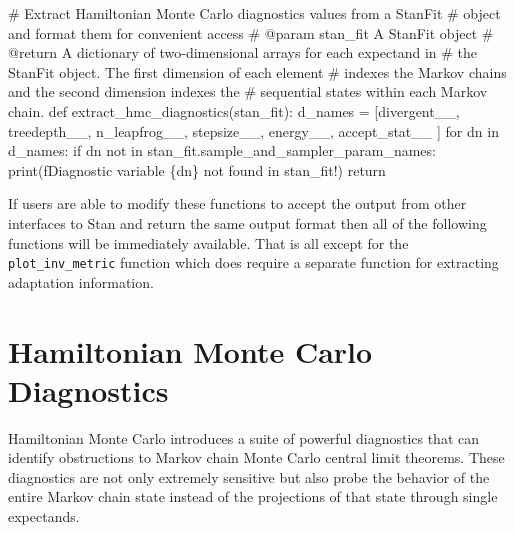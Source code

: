 \documentclass[
  letterpaper,
  DIV=11,
  numbers=noendperiod]{scrartcl}
\newenvironment{Shaded}{\begin{snugshade}}{\end{snugshade}}
\newcommand{\BuiltInTok}[1]{\textcolor[rgb]{0.00,0.23,0.31}{#1}}
\newcommand{\CommentTok}[1]{\textcolor[rgb]{0.37,0.37,0.37}{#1}}
\newcommand{\ControlFlowTok}[1]{\textcolor[rgb]{0.00,0.23,0.31}{#1}}
\newcommand{\KeywordTok}[1]{\textcolor[rgb]{0.00,0.23,0.31}{#1}}
\newcommand{\NormalTok}[1]{\textcolor[rgb]{0.00,0.23,0.31}{#1}}
\newcommand{\OperatorTok}[1]{\textcolor[rgb]{0.37,0.37,0.37}{#1}}
\newcommand{\SpecialCharTok}[1]{\textcolor[rgb]{0.37,0.37,0.37}{#1}}
\newcommand{\SpecialStringTok}[1]{\textcolor[rgb]{0.13,0.47,0.30}{#1}}
\newcommand{\StringTok}[1]{\textcolor[rgb]{0.13,0.47,0.30}{#1}}
\begin{document}
\begin{Shaded}
\begin{Highlighting}[]
\CommentTok{\# Extract Hamiltonian Monte Carlo diagnostics values from a StanFit}
\CommentTok{\# object and format them for convenient access}
\CommentTok{\# @param stan\_fit A StanFit object}
\CommentTok{\# @return A dictionary of two{-}dimensional arrays for each expectand in }
\CommentTok{\#         the StanFit object.  The first dimension of each element }
\CommentTok{\#         indexes the Markov chains and the second dimension indexes the }
\CommentTok{\#         sequential states within each Markov chain. }
\KeywordTok{def}\NormalTok{ extract\_hmc\_diagnostics(stan\_fit):}
\NormalTok{  d\_names }\OperatorTok{=}\NormalTok{ [}\StringTok{\textquotesingle{}divergent\_\_\textquotesingle{}}\NormalTok{, }\StringTok{\textquotesingle{}treedepth\_\_\textquotesingle{}}\NormalTok{, }\StringTok{\textquotesingle{}n\_leapfrog\_\_\textquotesingle{}}\NormalTok{,}
             \StringTok{\textquotesingle{}stepsize\_\_\textquotesingle{}}\NormalTok{, }\StringTok{\textquotesingle{}energy\_\_\textquotesingle{}}\NormalTok{, }\StringTok{\textquotesingle{}accept\_stat\_\_\textquotesingle{}}\NormalTok{ ]}
  \ControlFlowTok{for}\NormalTok{ dn }\KeywordTok{in}\NormalTok{ d\_names:}
    \ControlFlowTok{if}\NormalTok{ dn }\KeywordTok{not} \KeywordTok{in}\NormalTok{ stan\_fit.sample\_and\_sampler\_param\_names:}
      \BuiltInTok{print}\NormalTok{(}\SpecialStringTok{f\textquotesingle{}Diagnostic variable }\SpecialCharTok{\{}\NormalTok{dn}\SpecialCharTok{\}}\SpecialStringTok{ not found in stan\_fit!\textquotesingle{}}\NormalTok{)}
      \ControlFlowTok{return}
\end{Highlighting}
\end{Shaded}

If users are able to modify these functions to accept the output from
other interfaces to Stan and return the same output format then all of
the following functions will be immediately available. That is all
except for the \texttt{plot\_inv\_metric} function which does require a
separate function for extracting adaptation information.

\hypertarget{hamiltonian-monte-carlo-diagnostics}{%
\section{Hamiltonian Monte Carlo
Diagnostics}\label{hamiltonian-monte-carlo-diagnostics}}

Hamiltonian Monte Carlo introduces a suite of powerful diagnostics that
can identify obstructions to Markov chain Monte Carlo central limit
theorems. These diagnostics are not only extremely sensitive but also
probe the behavior of the entire Markov chain state instead of the
projections of that state through single expectands.
\end{document}
